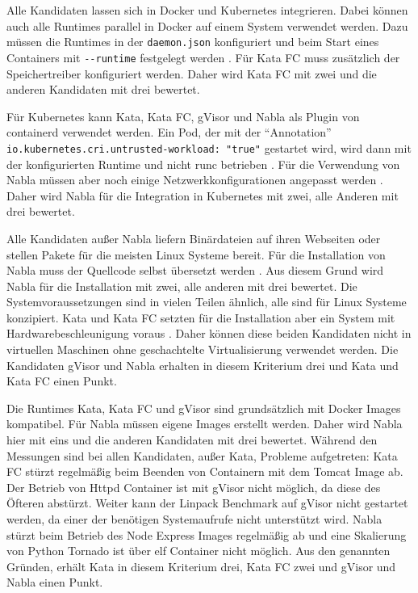 Alle Kandidaten lassen sich in Docker und Kubernetes integrieren. Dabei können auch alle Runtimes parallel in Docker auf einem System verwendet werden. Dazu müssen die Runtimes in der \lstinline[]|daemon.json| konfiguriert und beim Start eines Containers mit \lstinline[]|--runtime| festgelegt werden \cite[vgl.][]{UdoSeidel.2018}. Für Kata FC muss zusätzlich der Speichertreiber konfiguriert werden. Daher wird Kata FC mit zwei und die anderen Kandidaten mit drei bewertet. 

Für Kubernetes kann Kata, Kata FC, gVisor und Nabla als Plugin von containerd verwendet werden. Ein Pod, der mit der "`Annotation"' \lstinline[]|io.kubernetes.cri.untrusted-workload: "true"| gestartet wird, wird dann mit der konfigurierten Runtime und nicht runc betrieben \cite[vgl.][]{katacontainers.20190613, gVisor.20191024, nablacontainers.20181105}. Für die Verwendung von Nabla müssen aber noch einige Netzwerkkonfigurationen angepasst werden  \cite[vgl.][]{nablacontainers.20181105}. Daher wird Nabla für die Integration in Kubernetes mit zwei, alle Anderen mit drei bewertet.

Alle Kandidaten außer Nabla liefern Binärdateien auf ihren Webseiten oder stellen Pakete für die meisten Linux Systeme bereit. Für die Installation von Nabla muss der Quellcode selbst übersetzt werden \cite[vgl.][]{UdoSeidel.2018}. Aus diesem Grund wird Nabla für die Installation mit zwei, alle anderen mit drei bewertet.
Die Systemvoraussetzungen sind in vielen Teilen ähnlich, alle sind für Linux Systeme konzipiert. Kata und Kata FC setzten für die Installation aber ein System mit Hardwarebeschleunigung voraus  \cite[vgl.][108]{UdoSeidel.2018}. Daher können diese beiden Kandidaten nicht in virtuellen Maschinen ohne geschachtelte Virtualisierung verwendet werden. Die Kandidaten gVisor und Nabla erhalten in diesem Kriterium drei und Kata und Kata FC einen Punkt. 

Die Runtimes Kata, Kata FC und gVisor sind grundsätzlich mit Docker Images kompatibel. Für Nabla müssen eigene Images erstellt werden. Daher wird Nabla hier mit eins und die anderen Kandidaten mit drei bewertet. Während den Messungen sind bei allen Kandidaten, außer Kata, Probleme aufgetreten: Kata FC stürzt regelmäßig beim Beenden von Containern mit dem Tomcat Image ab. Der Betrieb von Httpd Container ist mit gVisor nicht möglich, da diese des Öfteren abstürzt. Weiter kann der Linpack Benchmark auf gVisor nicht gestartet werden, da einer der benötigen Systemaufrufe nicht unterstützt wird. Nabla stürzt beim Betrieb des Node Express Images regelmäßig ab und eine Skalierung von Python Tornado ist über elf Container nicht möglich. Aus den genannten Gründen, erhält Kata in diesem Kriterium drei, Kata FC zwei und gVisor und Nabla einen Punkt.

